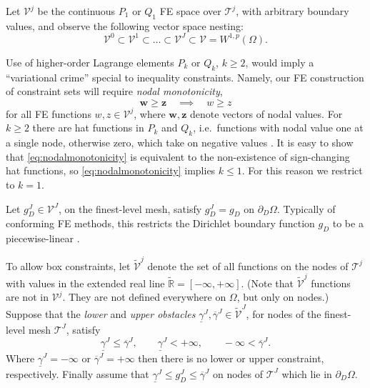 \documentclass[letterpaper,final,12pt,reqno]{amsart}
\theoremstyle{cstyle}
\theoremstyle{cstyle*}
\theoremstyle{dstyle}
\numberwithin{equation}{section}
\numberwithin{figure}{section}
\numberwithin{table}{section}
\numberwithin{theorem}{section}
\newcommand{\RR}{\mathbb{R}}
\newcommand{\bw}{\mathbf{w}}
\newcommand{\bz}{\mathbf{z}}
\begin{document}
Let $\mathcal{V}^j$ be the continuous $P_1$ or $Q_1$ FE space \cite{Elmanetal2014} over $\mathcal{T}^j$, with arbitrary boundary values, and observe the following vector space nesting:
\begin{equation}
\mathcal{V}^0 \subset \mathcal{V}^1 \subset \dots \subset \mathcal{V}^J \subset \mathcal{V}=W^{1,p}(\Omega).  \label{eq:fe:nestedspaces}
\end{equation}

Use of higher-order Lagrange elements $P_k$ or $Q_k$, $k\ge 2$, would imply a ``variational crime'' \cite[Chapter 10]{BrennerScott2007} special to inequality constraints.  Namely, our FE construction of constraint sets will require \emph{nodal monotonicity},
\begin{equation}
\bw \ge \bz \quad \implies \quad w \ge z \label{eq:nodalmonotonicity}
\end{equation}
for all FE functions $w,z \in \mathcal{V}^j$, where $\bw,\bz$ denote vectors of nodal values.  For $k\ge 2$ there are hat functions in $P_k$ and $Q_k$, i.e.~functions with nodal value one at a single node, otherwise zero, which take on negative values \cite[Figure 1.7]{Elmanetal2014}.  It is easy to show that \eqref{eq:nodalmonotonicity} is equivalent to the non-existence of sign-changing hat functions, so \eqref{eq:nodalmonotonicity} implies $k\le 1$.  For this reason we restrict to $k = 1$.

Let $g_D^J \in \mathcal{V}^J$, on the finest-level mesh, satisfy $g_D^J = g_D$ on $\partial_D \Omega$.  Typically of conforming FE methods, this restricts the Dirichlet boundary function $g_D$ to be a piecewise-linear \cite{Elmanetal2014}.

To allow box constraints, let $\tilde{\mathcal{V}}^j$ denote the set of all functions on the nodes of $\mathcal{T}^j$ with values in the extended real line $\tilde{\RR} = [-\infty,+\infty]$.  (Note that $\tilde{\mathcal{V}}^j$ functions are not in $\mathcal{V}^j$.  They are not defined everywhere on $\Omega$, but only on nodes.)  Suppose that the \emph{lower} and \emph{upper obstacles} $\underline{\gamma}^J, \overline{\gamma}^J \in \tilde{\mathcal{V}}^J$, for nodes of the finest-level mesh $\mathcal{T}^J$, satisfy
\begin{equation}
\underline{\gamma}^J \le \overline{\gamma}^J, \qquad \underline{\gamma}^J < +\infty, \qquad -\infty < \overline{\gamma}^J. \label{eq:fe:boxconstraintrequirements}
\end{equation}
Where $\underline{\gamma}^J=-\infty$ or $\overline{\gamma}^J=+\infty$ then there is no lower or upper constraint, respectively.  Finally assume that $\underline{\gamma}^J \le g_D^J \le \overline{\gamma}^J$ on nodes of $\mathcal{T}^J$ which lie in $\partial_D \Omega$.
\end{document}
